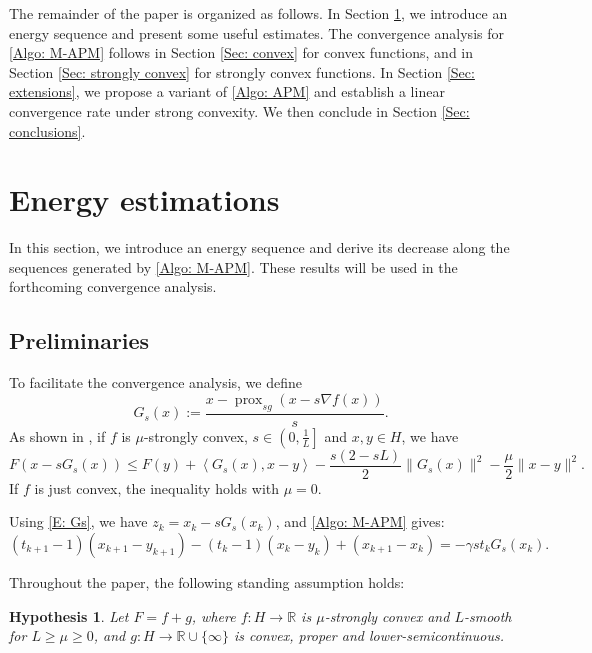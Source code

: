 \documentclass[pdflatex,sn-mathphys-num]{sn-jnl}
\theoremstyle{thmstyleone}
\theoremstyle{thmstyletwo}
\theoremstyle{thmstylethree}
\newtheorem{hypothesis}{Hypothesis}[section]
\DeclareMathOperator{\prox}{prox}
\newcommand{\R}{\mathbb{R}}
\begin{document}
The remainder of the paper is organized as follows. In Section \ref{Sec: energy_estimations}, we introduce an energy sequence and present some useful estimates. The convergence analysis for \eqref{Algo: M-APM} follows in Section \ref{Sec: convex} for convex functions, and in Section \ref{Sec: strongly convex} for strongly convex functions. In Section \ref{Sec: extensions}, we propose a variant of \eqref{Algo: APM} and establish a linear convergence rate under strong convexity. We then conclude in Section \ref{Sec: conclusions}.




\section{Energy estimations}\label{Sec: energy_estimations}
In this section, we introduce an energy sequence and derive its decrease along the sequences generated by \eqref{Algo: M-APM}. These results will be used in the forthcoming convergence analysis.


\subsection{Preliminaries}
To facilitate the convergence analysis, we define
\begin{equation}\label{E: Gs}
G_s(x) := \frac{ x - \prox_{sg}\left( x-s\nabla f(x) \right) }{s}.
\end{equation}
As shown in \cite[Lemma 7]{Bao_2023}, if $f$ is $\mu$-strongly convex, $s\in\left(0,\frac{1}{L}\right]$ and $x,y\in H$, we have 
\begin{equation} \label{E: prox_bound_SC}
F\left(x-sG_s(x)\right)  
  \le F(y) + \left\langle G_s(x), x-y \right\rangle
      - \frac{s(2 - sL)}{2} \| G_s(x) \|^2 - \frac{\mu}{2}\| x-y \|^2.    
\end{equation}
If $f$ is just convex, the inequality holds with $\mu=0$.


Using \eqref{E: Gs}, we have $z_k = x_k - sG_s(x_k)$, and \eqref{Algo: M-APM} gives:
\begin{equation}\label{E: iterates}
(t_{k+1}-1)(x_{k+1}-y_{k+1}) - (t_k-1)(x_k-y_k) + (x_{k+1}-x_k) 
= -\gamma s t_k G_s(x_k).
\end{equation}


Throughout the paper, the following standing assumption holds:
\begin{hypothesis}\label{Hypo: F}
Let $F=f+g$, where $f:H\to\R$ is $\mu$-strongly convex and $L$-smooth for $L\ge\mu\ge 0$, and $g:H\to\R\cup\{\infty\}$ is convex, proper and lower-semicontinuous.
\end{hypothesis}
\end{document}
